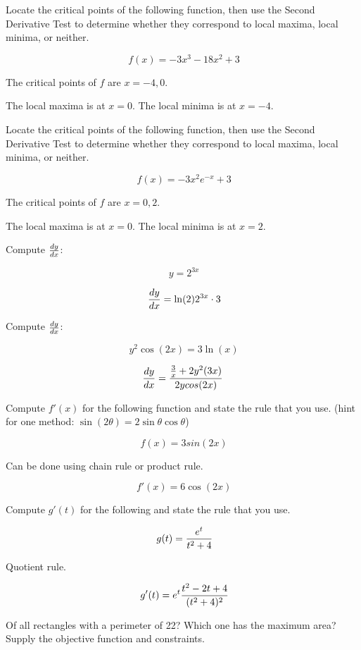 Locate the critical points of the following function, then
use the Second Derivative Test to determine whether they
correspond to local maxima, local minima, or neither.

$$\
f(x) = -3x^3 - 18x^2 + 3
$$

The critical points of $f$ are $x = -4, 0$.

\par The local maxima is at $x = 0$. The local minima is
at $x = -4$.

Locate the critical points of the following function, then
use the Second Derivative Test to determine whether they
correspond to local maxima, local minima, or neither.

$$\
f(x) = -3x^2e^{-x} + 3
$$

The critical points of $f$ are $x = 0, 2$.

\par The local maxima is at $x = 0$. The local minima is
at $x = 2$.

Compute $dy \over dx$:

$$\
y = 2^{3x}
$$

$$\
{dy \over dx} =
\ln(2) 2^{3x} \cdot 3
$$

Compute $dy \over dx$:

$$\
y^2 \cos(2x) = 3 \ln(x)
$$

$$
{dy \over dx} = {
{3 \over x} + 2y^2 (3x)
\over
2y cos(2x)
}
$$

Compute $f'(x)$ for the following function and state the
rule that you use. (hint for one method: $\sin(2\theta) = 2\sin\theta\cos\theta$)

$$\
f(x) = 3sin(2x)
$$

\solution{QZ.5.1}
Can be done using chain rule or product rule.

$$\
f'(x) = 6\cos(2x)
$$

\problem{QZ.5.2}
Compute $g'(t)$ for the following and state the rule that
you use.

$$\
g(t) = {e^t \over {t^2 + 4}}
$$

\solution{QZ.5.2}
Quotient rule.

$$\
g'(t) = e^t {t^2 - 2t + 4 \over (t^2 + 4)^2}
$$

Of all rectangles with a perimeter of 22? Which one has
the maximum area? Supply the objective function and constraints.

